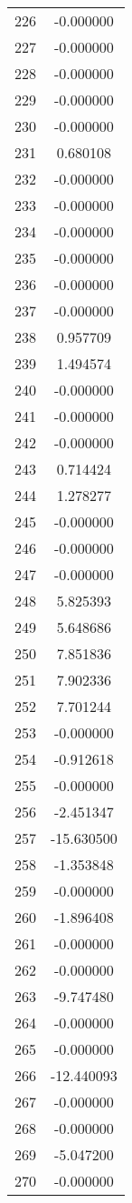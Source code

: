 \documentclass[12pt]{article}
\begin{document}
\begin{longtable}{@{}cc@{}}
226 & -0.000000 \\
227 & -0.000000 \\
228 & -0.000000 \\
229 & -0.000000 \\
230 & -0.000000 \\
231 & 0.680108 \\
232 & -0.000000 \\
233 & -0.000000 \\
234 & -0.000000 \\
235 & -0.000000 \\
236 & -0.000000 \\
237 & -0.000000 \\
238 & 0.957709 \\
239 & 1.494574 \\
240 & -0.000000 \\
241 & -0.000000 \\
242 & -0.000000 \\
243 & 0.714424 \\
244 & 1.278277 \\
245 & -0.000000 \\
246 & -0.000000 \\
247 & -0.000000 \\
248 & 5.825393 \\
249 & 5.648686 \\
250 & 7.851836 \\
251 & 7.902336 \\
252 & 7.701244 \\
253 & -0.000000 \\
254 & -0.912618 \\
255 & -0.000000 \\
256 & -2.451347 \\
257 & -15.630500 \\
258 & -1.353848 \\
259 & -0.000000 \\
260 & -1.896408 \\
261 & -0.000000 \\
262 & -0.000000 \\
263 & -9.747480 \\
264 & -0.000000 \\
265 & -0.000000 \\
266 & -12.440093 \\
267 & -0.000000 \\
268 & -0.000000 \\
269 & -5.047200 \\
270 & -0.000000 \\

\end{longtable}
\end{document}
